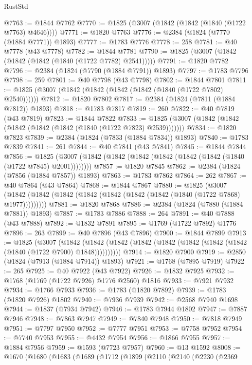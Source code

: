 \begin{lexlean}{RustStd}
\begin{coremodule}
@7763 := @1844 @7762
@7770 := @1825 (@3007 (@1842 (@1842 (@1840 (@1722 @7763) @4646))))
@7771 := @1820 @7763
@7776 := @2384 (@1824 (@7770 (@1884 @7771)) @1893)
@7777 := @1783 @7776
@7778 := 258
@7781 := @40 @7778 (@43 @7778)
@7782 := @1844 @7781
@7790 := @1825 (@3007 (@1842 (@1842 (@1842 (@1840 (@1722 @7782) @2541)))))
@7791 := @1820 @7782
@7796 := @2384 (@1824 (@7790 (@1884 @7791)) @1893)
@7797 := @1783 @7796
@7798 := 259
@7801 := @40 @7798 (@43 @7798)
@7802 := @1844 @7801
@7811 := @1825 (@3007 (@1842 (@1842 (@1842 (@1842 (@1840 (@1722 @7802) @2540))))))
@7812 := @1820 @7802
@7817 := @2384 (@1824 (@7811 (@1884 @7812)) @1893)
@7818 := @1783 @7817
@7819 := 260
@7822 := @40 @7819 (@43 @7819)
@7823 := @1844 @7822
@7833 := @1825 (@3007 (@1842 (@1842 (@1842 (@1842 (@1842 (@1840 (@1722 @7823) @2539)))))))
@7834 := @1820 @7823
@7839 := @2384 (@1824 (@7833 (@1884 @7834)) @1893)
@7840 := @1783 @7839
@7841 := 261
@7844 := @40 @7841 (@43 @7841)
@7845 := @1844 @7844
@7856 := @1825 (@3007 (@1842 (@1842 (@1842 (@1842 (@1842 (@1842 (@1840 (@1722 @7845) @2001))))))))
@7857 := @1820 @7845
@7862 := @2384 (@1824 (@7856 (@1884 @7857)) @1893)
@7863 := @1783 @7862
@7864 := 262
@7867 := @40 @7864 (@43 @7864)
@7868 := @1844 @7867
@7880 := @1825
    (@3007 (@1842 (@1842 (@1842 (@1842 (@1842 (@1842 (@1842 (@1840 (@1722 @7868) @1977)))))))))
@7881 := @1820 @7868
@7886 := @2384 (@1824 (@7880 (@1884 @7881)) @1893)
@7887 := @1783 @7886
@7888 := 264
@7891 := @40 @7888 (@43 @7888)
@7892 := @1832 @7891
@7895 := @1769 (@1722 @7892) @1776
@7896 := 263
@7899 := @40 @7896 (@43 @7896)
@7900 := @1844 @7899
@7913 := @1825
    (@3007
      (@1842 (@1842 (@1842 (@1842 (@1842 (@1842 (@1842 (@1842 (@1840 (@1722 @7900) @1848))))))))))
@7914 := @1820 @7900
@7919 := @2850 (@1824 (@7913 (@1884 @7914)) @1893)
@7921 := @1768 (@7895 @7919)
@7922 := 265
@7925 := @40 @7922 (@43 @7922)
@7926 := @1832 @7925
@7932 := @1768 (@1769 (@1722 @7926) @1776 @2560) @1816
@7933 := @7921 @7932
@7934 := @1766 @7933
@7936 := @1783 (@1820 @7892)
@7939 := @1783 (@1820 @7926) @1802
@7940 := @7936 @7939
@7942 := @2568 @7940 @1698
@7944 := @1837 (@7934 @7942)
@7946 := @1783 @7944 @1802
@7947 := @7887 @7946
@7948 := @7863 @7947
@7949 := @7840 @7948
@7950 := @7818 @7949
@7951 := @7797 @7950
@7952 := @7777 @7951
@7953 := @7758 @7952
@7954 := @7740 @7953
@7955 := @4432 @7954
@7956 := @1866 @7955
@7957 := @1884 @7956
@7959 := @1593 (@7723 @7957)
@7960 := @13 @1592
@8008 := @1670
    (@1680
      (@1683
        (@1689
          (@1712
            (@1899
              (@2110
                (@2140
                  (@2230
                    (@2369

\end{coremodule}
\end{lexlean}

